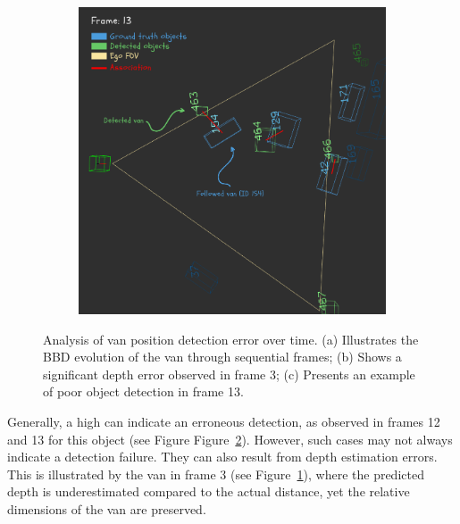 \begin{figure}[h!]
\begin{subfigure}[b]{0.32\textwidth}
        \caption{}
        \label{fig:van_bbd_through_frames_b}
    \end{subfigure}
    \hfill
    \begin{subfigure}[b]{0.32\textwidth}
        \includegraphics[width=\textwidth]{images/experiments/evaluation_frames/3d_evaluation_frame_13_canva.png}
        \caption{}
        \label{fig:van_bbd_through_frames_c}
    \end{subfigure}
    \caption{Analysis of van position detection error over time. (a) Illustrates the BBD evolution of the van through sequential frames; (b) Shows a significant depth error observed in frame 3; (c) Presents an example of poor object detection in frame 13.}
    \label{fig:van_bbd_through_frames}
\end{figure}


Generally, a high  can indicate an erroneous detection, as observed in frames 12 and 13 for this object (see Figure Figure~\ref{fig:van_bbd_through_frames_c}). However, such cases may not always indicate a detection failure. They can also result from depth estimation errors. This is illustrated by the van in frame 3 (see Figure~\ref{fig:van_bbd_through_frames_b}), where the predicted depth is underestimated compared to the actual distance, yet the relative dimensions of the van are preserved.


